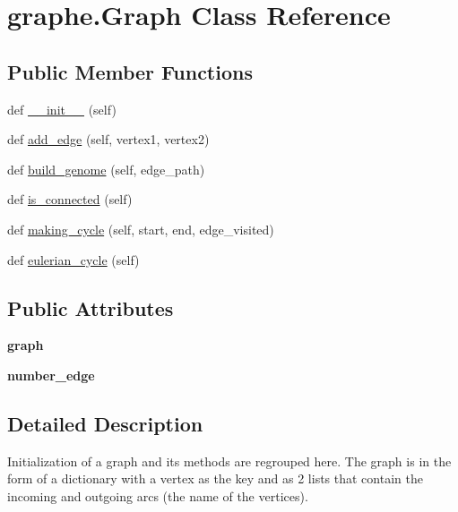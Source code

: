 \hypertarget{classgraphe_1_1Graph}{}\section{graphe.\+Graph Class Reference}
\label{classgraphe_1_1Graph}
\subsection*{Public Member Functions}
\begin{DoxyCompactItemize}
\item 
def \mbox{\hyperlink{classgraphe_1_1Graph_ac27b8aa0b0a84a72bc84af9e0a3c42cd}{\+\_\+\+\_\+init\+\_\+\+\_\+}} (self)
\item 
def \mbox{\hyperlink{classgraphe_1_1Graph_a944cef16d8feee30f98e8f3c0fc11f18}{add\+\_\+edge}} (self, vertex1, vertex2)
\item 
def \mbox{\hyperlink{classgraphe_1_1Graph_a0a1b1627da2894e30d9f65ba38304777}{build\+\_\+genome}} (self, edge\+\_\+path)
\item 
def \mbox{\hyperlink{classgraphe_1_1Graph_a6d0519dfdd5684ee06e5459703682e53}{is\+\_\+connected}} (self)
\item 
def \mbox{\hyperlink{classgraphe_1_1Graph_a9eae77f71af02fb458e27c17479dd326}{making\+\_\+cycle}} (self, start, end, edge\+\_\+visited)
\item 
def \mbox{\hyperlink{classgraphe_1_1Graph_a83fff8017d68d9414413f1a90873e1f8}{eulerian\+\_\+cycle}} (self)
\end{DoxyCompactItemize}
\subsection*{Public Attributes}
\begin{DoxyCompactItemize}
\item 
\mbox{\label{classgraphe_1_1Graph_a84295b5fb8ebcfdbb1eb77a34ba3c997}} 
{\bfseries graph}
\item 
\mbox{\label{classgraphe_1_1Graph_aed4d4ffd6773c349d26bb14da0be476c}} 
{\bfseries number\+\_\+edge}
\end{DoxyCompactItemize}


\subsection{Detailed Description}
\begin{DoxyVerb}Initialization of a graph and its methods are regrouped here.
The graph is in the form of a dictionary with a vertex as the key and as 2 lists that contain the incoming and outgoing arcs (the name of the vertices).
\end{DoxyVerb}
 

